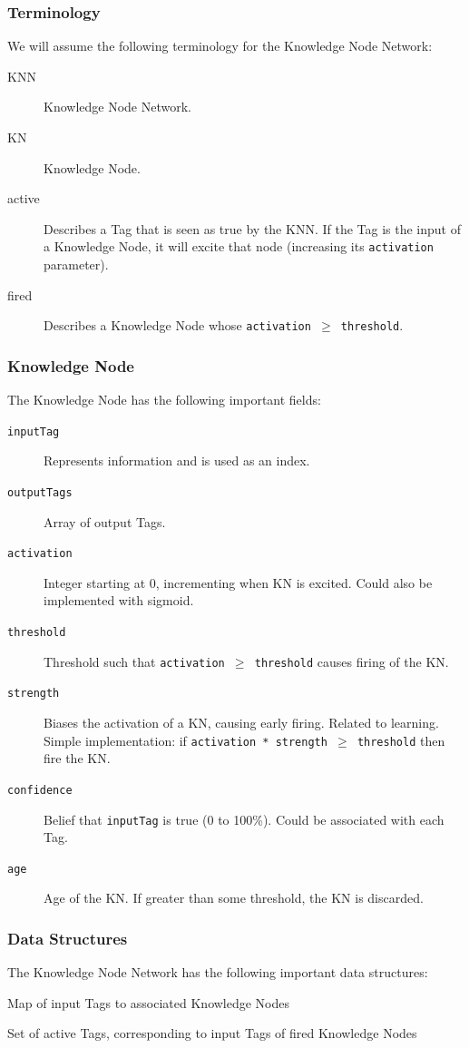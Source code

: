 \documentclass{beamer}
\newcommand{\code}[1]{\texttt{#1}}
\begin{document}
	\begin{frame}
		\frametitle{Terminology}
		We will assume the following terminology for the Knowledge Node Network:
		\begin{description}
			\item[KNN] Knowledge Node Network.
			\item[KN] Knowledge Node.
			\item[active] Describes a Tag that is seen as true by the KNN. If the Tag is the input of a Knowledge Node, it will excite that node (increasing its \code{activation} parameter).
			\item[fired] Describes a Knowledge Node whose \code{activation $\geq$ threshold}.
		\end{description}
	\end{frame}

	\begin{frame}
		\frametitle{Knowledge Node}
		The Knowledge Node has the following important fields:
		\begin{description}
			\item[\code{inputTag}] Represents information and is used as an index.
			\item[\code{outputTags}] Array of output Tags.
			\item[\code{activation}] Integer starting at 0, incrementing when KN is excited. Could also be implemented with sigmoid.
			\item[\code{threshold}] Threshold such that \code{activation $\geq$ threshold} causes firing of the KN.
			\item[\code{strength}] Biases the activation of a KN, causing early firing. Related to learning. Simple implementation: if \code{activation * strength $\geq$ threshold} then fire the KN.
			\item[\code{confidence}] Belief that \code{inputTag} is true (0 to 100\%). Could be associated with each Tag.
			\item[\code{age}] Age of the KN. If greater than some threshold, the KN is discarded.
		\end{description}
	\end{frame}
	
	\begin{frame}
		\frametitle{Data Structures}
		The Knowledge Node Network has the following important data structures:
		\begin{description}[\code{activeTagsMETA}]
			\item[\code{mapKN}] Map of input Tags to associated Knowledge Nodes
			\item[\code{activeTags}] Set of active Tags, corresponding to input Tags of fired Knowledge Nodes
		\end{description}
	\end{frame}
\end{document}

